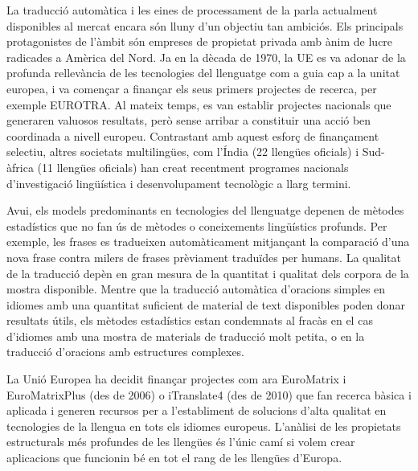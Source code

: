 \documentclass[]{../../metanetpaper}
\begin{document}
\begin{multicols}{2}

La traducció automàtica i les eines de processament de la parla actualment disponibles al mercat encara són lluny d'un objectiu tan ambiciós. Els principals protagonistes de l'àmbit són empreses de propietat privada amb ànim de lucre radicades a Amèrica del Nord. Ja en la dècada de 1970, la UE es va adonar de la profunda rellevància de les tecnologies del llenguatge com a guia cap a la unitat europea, i va començar a finançar els seus primers projectes de recerca, per exemple EUROTRA. Al mateix temps, es van establir projectes nacionals que generaren valuosos resultats, però sense arribar a constituir una acció ben coordinada a nivell europeu. Contrastant amb aquest esforç de finançament selectiu, altres societats multilingües, com l'Índia (22 llengües oficials) i Sud-àfrica (11 llengües oficials) han creat recentment programes nacionals d'investigació lingüística i desenvolupament tecnològic a llarg termini.

Avui, els models predominants en tecnologies del llenguatge depenen de mètodes estadístics que no fan ús de mètodes o coneixements lingüístics profunds. Per exemple, les frases es tradueixen automàticament mitjançant la comparació d'una nova frase contra milers de frases prèviament traduïdes per humans. La qualitat de la traducció depèn en gran mesura de la quantitat i qualitat dels corpora de la mostra disponible. Mentre que la traducció automàtica d'oracions simples en idiomes amb una quantitat suficient de material de text disponibles poden donar resultats útils, els mètodes estadístics estan condemnats al fracàs en el cas d'idiomes amb una mostra de materials de traducció molt petita, o en la traducció d'oracions amb estructures complexes.

La Unió Europea ha decidit finançar projectes com ara EuroMatrix i EuroMatrixPlus (des de 2006) o iTranslate4 (des de 2010) que fan recerca bàsica i aplicada i generen recursos per a l'establiment de solucions d'alta qualitat en tecnologies de la llengua en tots els idiomes europeus. L'anàlisi de les propietats estructurals més profundes de les llengües és l'únic camí si volem crear aplicacions que funcionin bé en tot el rang de les llengües d'Europa.


\end{multicols}
\end{document}
